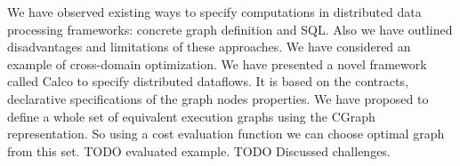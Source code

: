 We have observed existing ways to specify computations in distributed data processing frameworks: concrete graph definition and SQL.
Also we have outlined disadvantages and limitations of these approaches.
We have considered an example of cross-domain optimization.
We have presented a novel framework called Calco to specify distributed dataflows.
It is based on the contracts, declarative specifications of the graph nodes properties.
We have proposed to define a whole set of equivalent execution graphs using the CGraph representation.
So using a cost evaluation function we can choose optimal graph from this set.
TODO evaluated example.
TODO Discussed challenges.
